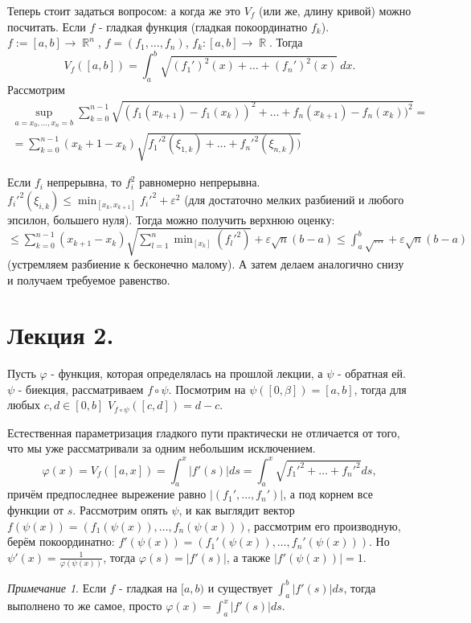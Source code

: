 \documentclass[a4paper,100pt]{article}
\theoremstyle{indented}
\theoremstyle{definition}
\theoremstyle{remark}
\newtheorem{remark}{Примечание}
\DeclareMathOperator{\RR}{\mathbb{R}}
\begin{document}
Теперь стоит задаться вопросом: а когда же это $V_f$ (или же, длину кривой) можно посчитать. Если $f$ - гладкая функция (гладкая покоординатно $f_k$). $f:=[a, b]\rightarrow \RR^n$, $f=(f_1, \ldots, f_n)$, $f_k:[a, b]\rightarrow \RR$. Тогда
\[
    V_f([a, b])=\int_a^b\sqrt{(f_1')^2(x)+\ldots+(f_n')^2(x)}\: dx.
\]
Рассмотрим
\begin{eqnarray*}
    \sup_{a=x_0, \ldots, x_n=b}\sum_{k=0}^{n-1}\sqrt{(f_1(x_{k+1})-f_1(x_k))^2+\ldots+f_n(x_{k+1})-f_n(x_k))^2} = \\ 
    = \sum_{k=0}^{n-1}(x_k+1-x_k)\sqrt{f_1'^2(\xi_{1, k})+\ldots+f_n'^2(\xi_{n, k}))}
\end{eqnarray*}

Если $f_i$ непрерывна, то $f_i^2$ равномерно непрерывна. $f_i'^2(\xi_{i, k})\leq \min_{[x_k, x_{k+1}]}f_i'^2+\varepsilon^2$ (для достаточно мелких разбиений и любого эпсилон, большего нуля). Тогда можно получить верхнюю оценку: $\leq \sum_{k=0}^{n-1}(x_{k+1}-x_k)\sqrt{\sum_{l=1}^n \min_{[x_k]}(f_l'^2)}+\varepsilon \sqrt{n}(b-a)\leq \int_a^b\sqrt{\dots}+\varepsilon \sqrt{n}(b-a)$ (устремляем разбиение к бесконечно малому). А затем делаем аналогично снизу и получаем требуемое равенство.

\section{Лекция 2.}

Пусть $\varphi$ - функция, которая определялась на прошлой лекции, а $\psi$ - обратная ей. $\psi$ - биекция, рассматриваем $f\circ \psi$. Посмотрим на $\psi([0, \beta])=[a,b]$, тогда для любых $c, d\in [0, b]$ $V_{f\circ\psi}([c, d])=d-c$.



Естественная параметризация гладкого пути практически не отличается от того, что мы уже рассматривали за одним небольшим исключением. 
\[
    \varphi(x)=V_f([a, x])=\int_a^x\vert f'(s)\vert ds=\int_a^x\sqrt{f_1'^2+\ldots+f_n'^2}ds,
\]
причём предпоследнее вырежение равно $\vert (f_1', \ldots, f_n')\vert$, а под корнем все функции от $s$. Рассмотрим опять $\psi$, и как выглядит вектор $f(\psi(x))=(f_1(\psi(x)), \ldots, f_n(\psi(x)))$, рассмотрим его производную, берём покоординатно: $f'(\psi(x))=(f_1'(\psi(x)), \ldots, f_n'(\psi(x)))$. Но $\psi'(x)=\frac{1}{\varphi(\psi(x))}$, тогда $\varphi(s)=\vert f'(s)\vert$, а также $\vert f'(\psi(x))\vert=1$.

\begin{remark}
    Если $f$ - гладкая на $[a, b)$ и существует $\int_a^b|f'(s)|ds$, тогда выполнено то же самое, просто $\varphi(x)=\int_a^x|f'(s)|ds$.
\end{remark}
\end{document}
